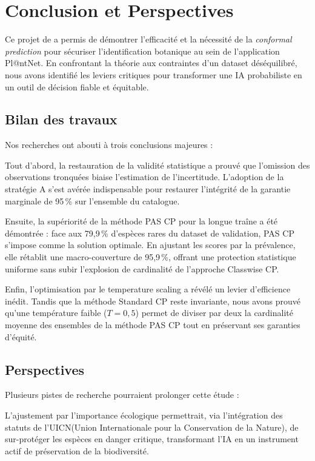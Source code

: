\documentclass[12pt,a4paper]{article}
\begin{document}
\newpage
\section{Conclusion et Perspectives}

Ce projet de a permis de démontrer l'efficacité et la nécessité de la \textit{conformal prediction} pour sécuriser l'identification botanique au sein de l'application Pl@ntNet. En confrontant la théorie aux contraintes d'un dataset déséquilibré, nous avons identifié les leviers critiques pour transformer une IA probabiliste en un outil de décision fiable et équitable.




\subsection{Bilan des travaux}

Nos recherches ont abouti à trois conclusions majeures : 

Tout d'abord, la restauration de la validité statistique a prouvé que l'omission des observations tronquées biaise l'estimation de l'incertitude. L'adoption de la stratégie A s'est avérée indispensable pour restaurer l'intégrité de la garantie marginale de 95\,\% sur l'ensemble du catalogue.

Ensuite, la supériorité de la méthode PAS CP pour la longue traîne a été démontrée : face aux 79,9\,\% d'espèces rares du dataset de validation, PAS CP s'impose comme la solution optimale. En ajustant les scores par la prévalence, elle rétablit une macro-couverture de 95,9\,\%, offrant une protection statistique uniforme sans subir l'explosion de cardinalité de l'approche Classwise CP.

Enfin, l'optimisation par le temperature scaling a révélé un levier d'efficience inédit. Tandis que la méthode Standard CP reste invariante, nous avons prouvé qu'une température faible (\textbf{$T=0,5$}) permet de diviser par deux la cardinalité moyenne des ensembles de la méthode PAS CP tout en préservant ses garanties d'équité.



\subsection{Perspectives}

Plusieurs pistes de recherche pourraient prolonger cette étude :

L'ajustement par l'importance écologique \cite{Ding2025} permettrait, via l'intégration des statuts de l'UICN(Union Internationale pour la Conservation de la Nature), de sur-protéger les espèces en danger critique, transformant l'IA en un instrument actif de préservation de la biodiversité.
\end{document}
